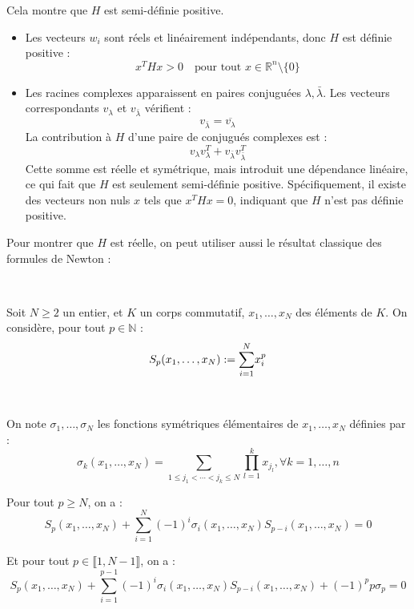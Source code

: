 Cela montre que $H$ est semi-d{\'e}finie positive.
\begin{itemize}
  \item {}
  
  Les vecteurs $w_i$ sont r{\'e}els et lin{\'e}airement ind{\'e}pendants, donc
  $H$ est d{\'e}finie positive :
  \[ x^T Hx > 0 \quad \text{pour tout } x \in \mathbb{R}^n \setminus \{0\} \]
  \item {}
  
  Les racines complexes apparaissent en paires conjugu{\'e}es $\lambda,
  \bar{\lambda}$. Les vecteurs correspondants $v_{\lambda}$ et
  $v_{\bar{\lambda}}$ v{\'e}rifient :
  \[ v_{\bar{\lambda}} = \overline{v_{\lambda}} \]
  La contribution {\`a} $H$ d'une paire de conjugu{\'e}s complexes est :
  \[ v_{\lambda} v_{\lambda}^T + v_{\bar{\lambda}} v_{\bar{\lambda}}^T \]
  Cette somme est r{\'e}elle et sym{\'e}trique, mais introduit une
  d{\'e}pendance lin{\'e}aire, ce qui fait que $H$ est seulement
  semi-d{\'e}finie positive. Sp{\'e}cifiquement, il existe des vecteurs non
  nuls $x$ tels que $x^T Hx = 0$, indiquant que $H$ n'est pas d{\'e}finie
  positive.
\end{itemize}



Pour montrer que $H$ est r{\'e}elle, on peut utiliser aussi le r{\'e}sultat
classique des formules de Newton :

\


Soit $N \geqslant 2$ un entier, et $K$ un corps commutatif, $x_1, \ldots, x_N$
des {\'e}l{\'e}ments de $K$. On consid{\`e}re, pour tout $p \in \mathbb{N}$ :
\[ S_p (x_1, \ldots, x_N) := \underset{i = 1}{\overset{N}{\sum}} x^p_i \]


\

On note $\sigma_1, \ldots, \sigma_N$ les fonctions sym{\'e}triques
{\'e}l{\'e}mentaires de $x_1, \ldots, x_N$ d{\'e}finies par :
\[ \sigma_k (x_1, \ldots, x_N) = \overset{}{\underset{1 \leqslant j_1 < \cdots
   < j_k \leqslant N}{\sum}}  \underset{l = 1}{\overset{k}{\prod}} x_{j_l},
   \forall k = 1, \ldots, n \]


Pour tout $p \geqslant N$, on a :
\[ S_p (x_1, \ldots, x_N) + \underset{i = 1}{\overset{N}{\sum}} (- 1)^i
   \sigma_i (x_1, \ldots, x_N) S_{p - i} (x_1, \ldots, x_N) = 0 \]


Et pour tout $p \in \llbracket 1, N - 1 \rrbracket$, on a :
\[ S_p (x_1, \ldots, x_N) + \underset{i = 1}{\overset{p - 1}{\sum}} (- 1)^i
   \sigma_i (x_1, \ldots, x_N) S_{p - i} (x_1, \ldots, x_N) + (- 1)^p p
   \sigma_p = 0 \]


